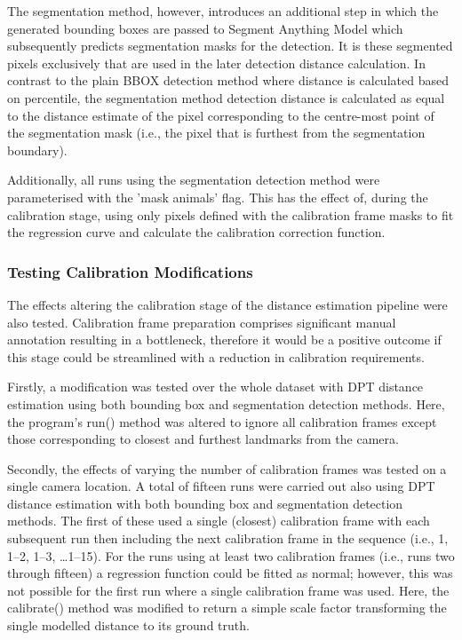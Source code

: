 The segmentation method, however, introduces an additional step in which the generated bounding
boxes are passed to Segment Anything Model which subsequently predicts segmentation masks for
the detection.
It is these segmented pixels exclusively that are used in the later detection distance calculation.
In contrast to the plain BBOX detection method where distance is calculated based on
percentile, the segmentation method detection distance is calculated as equal to the distance
estimate of the pixel corresponding to the centre-most point of the segmentation mask (i.e., the pixel
that is furthest from the segmentation boundary).

Additionally, all runs using the segmentation detection method were parameterised with the
'mask animals' flag.
This has the effect of, during the calibration stage, using only pixels defined with the calibration
frame masks to fit the regression curve and calculate the calibration correction function.

\subsubsection{Testing Calibration Modifications}

The effects altering the calibration stage of the distance estimation pipeline were also tested.
Calibration frame preparation comprises significant manual annotation resulting in a bottleneck,
therefore it would be a positive outcome if this stage could be streamlined with a reduction in
calibration requirements.

Firstly, a modification was tested over the whole dataset with DPT distance estimation using both
bounding box and segmentation detection methods.
Here, the program's run() method was altered to ignore all calibration frames except those corresponding
to closest and furthest landmarks from the camera.

Secondly, the effects of varying the number of calibration frames was tested on a single camera
location.
A total of fifteen runs were carried out also using DPT distance estimation with both bounding box
and segmentation detection methods.
The first of these used a single (closest) calibration frame with each subsequent run then including
the next calibration frame in the sequence (i.e., 1, 1–2, 1–3, \ldots 1–15).
For the runs using at least two calibration frames (i.e., runs two through fifteen) a regression
function could be fitted as normal; however, this was not possible for the first run where a single
calibration frame was used.
Here, the calibrate() method was modified to return a simple scale factor transforming the single
modelled distance to its ground truth.